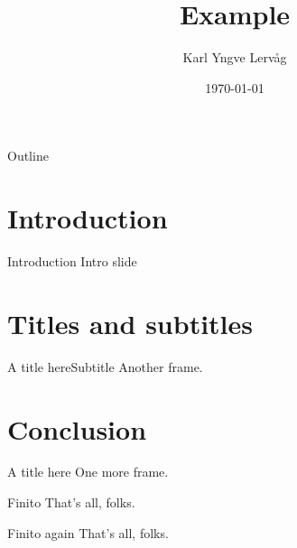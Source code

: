 \documentclass{beamer}
\title{Example}
\author{Karl Yngve Lervåg}
\date{\today}
\begin{document}
\begin{frame}{Outline}
  \tableofcontents
\end{frame}

\section{Introduction}
\begin{frame}{Introduction}
  Intro slide
\end{frame}

\section{Titles and subtitles}
\begin{frame}{A title here}{Subtitle}
  Another frame.
\end{frame}

\section{Conclusion}
\begin{frame}{A title here}
  One more frame.
\end{frame}
\begin{frame}{Finito}
  That's all, folks.
\end{frame}
\begin{frame}[fragile]{Finito again}
  That's all, folks.
\end{frame}
\end{document}
